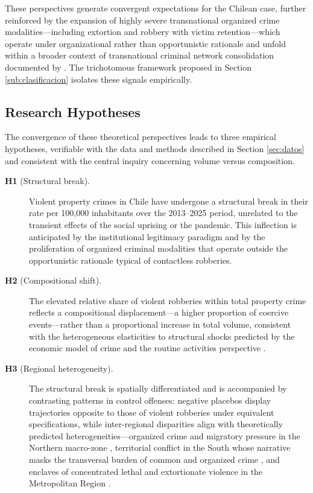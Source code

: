 \documentclass[pdflatex,sn-basic]{sn-jnl}
\begin{document}
These perspectives generate convergent expectations for the Chilean case, further reinforced by the expansion of highly severe transnational organized crime modalities---including extortion and robbery with victim retention---which operate under organizational rather than opportunistic rationale \citep{dammert2025} and unfold within a broader context of transnational criminal network consolidation documented by \citet{greene2023}. The trichotomous framework proposed in Section \ref{sub:clasificacion} isolates these signals empirically.

\subsection{Research Hypotheses}
\label{sub:hipotesis}

The convergence of these theoretical perspectives leads to three empirical hypotheses, verifiable with the data and methods described in Section \ref{sec:datos} and consistent with the central inquiry concerning volume versus composition.

\begin{description}
  \item[\textbf{H1} (Structural break).] Violent property crimes in Chile have undergone a structural break in their rate per 100,000 inhabitants over the 2013--2025 period, unrelated to the transient effects of the social uprising or the pandemic. This inflection is anticipated by the institutional legitimacy paradigm \citep{tyler2006,rosenfeld2021} and by the proliferation of organized criminal modalities \citep{greene2023,dammert2025} that operate outside the opportunistic rationale typical of contactless robberies.

  \item[\textbf{H2} (Compositional shift).] The elevated relative share of violent robberies within total property crime reflects a compositional displacement---a higher proportion of coercive events---rather than a proportional increase in total volume, consistent with the heterogeneous elasticities to structural shocks predicted by the economic model of crime \citep{becker1968} and the routine activities perspective \citep{cohen1979}.

  \item[\textbf{H3} (Regional heterogeneity).] The structural break is spatially differentiated and is accompanied by contrasting patterns in control offenses: negative placebos display trajectories opposite to those of violent robberies under equivalent specifications, while inter-regional disparities align with theoretically predicted heterogeneities---organized crime and migratory pressure in the Northern macro-zone \citep{bravo2024}, territorial conflict in the South whose narrative masks the transversal burden of common and organized crime \citep{izquierdo2024}, and enclaves of concentrated lethal and extortionate violence in the Metropolitan Region \citep{dammert2025}.
\end{description}
\end{document}
